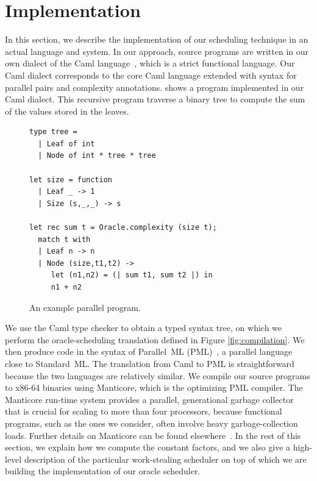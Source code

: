 \section{Implementation}
\label{sec:imp}

In this section, we describe the implementation of our scheduling
technique in an actual language and system. In our approach, source
programs are written in our own dialect of the 
Caml language~\cite{objective-caml}, which is 
a strict functional language. 
Our Caml dialect corresponds to the core Caml language
extended with syntax for parallel pairs and complexity annotations. 
 shows a program implemented in our Caml dialect.
This recursive program traverse a binary
tree to compute the sum of the values stored in the leaves.
 
\begin{figure}[t]
\begin{verbatim}
type tree = 
  | Leaf of int 
  | Node of int * tree * tree

let size = function
  | Leaf _ -> 1
  | Size (s,_,_) -> s

let rec sum t = Oracle.complexity (size t);
  match t with
  | Leaf n -> n  
  | Node (size,t1,t2) ->
     let (n1,n2) = (| sum t1, sum t2 |) in
     n1 + n2
\end{verbatim}
\caption{An example parallel program.}
\label{fig:exampleprog}
\end{figure}

We use the Caml type checker to obtain a typed syntax tree, on which
we perform the oracle-scheduling translation defined in Figure
\ref{fig:compilation}. We then produce code in the syntax
of Parallel~ML (PML)~\cite{FluetRaReSh11}, a parallel 
language close to Standard~ML. The translation from Caml
to PML is straightforward because the two languages are 
relatively similar.
We compile our source programs to x86-64 binaries using Manticore,
which is the optimizing PML compiler. The Manticore run-time system
provides a parallel, generational garbage collector that is crucial
for scaling to more than four processors, because functional programs,
such as the ones we consider, often involve heavy garbage-collection
loads. Further details on Manticore can be found
elsewhere~\cite{Fluet:2008:SFG:1411204.1411239}.
In the rest of this section, we explain how we compute
the constant factors, and we also give a high-level description 
of the particular work-stealing scheduler on top of which 
we are building the implementation of our oracle scheduler.

